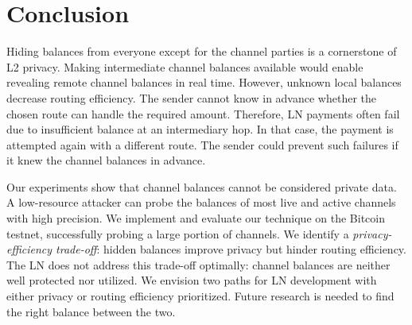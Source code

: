 \section{Conclusion} \label{sec:conclusion}

Hiding balances from everyone except for the channel parties is a cornerstone of L2 privacy.
Making intermediate channel balances available would enable revealing remote channel balances in real time.
However, unknown local balances decrease routing efficiency.
The sender cannot know in advance whether the chosen route can handle the required amount.
Therefore, LN payments often fail due to insufficient balance at an intermediary hop.
In that case, the payment is attempted again with a different route.
The sender could prevent such failures if it knew the channel balances in advance.

Our experiments show that channel balances cannot be considered private data.
A low-resource attacker can probe the balances of most live and active channels with high precision.
We implement and evaluate our technique on the Bitcoin testnet, successfully probing a large portion of channels.
We identify a \textit{privacy-efficiency trade-off}: hidden balances improve privacy but hinder routing efficiency.
The LN does not address this trade-off optimally: channel balances are neither well protected nor utilized.
We envision two paths for LN development with either privacy or routing efficiency prioritized.
Future research is needed to find the right balance between the two.
